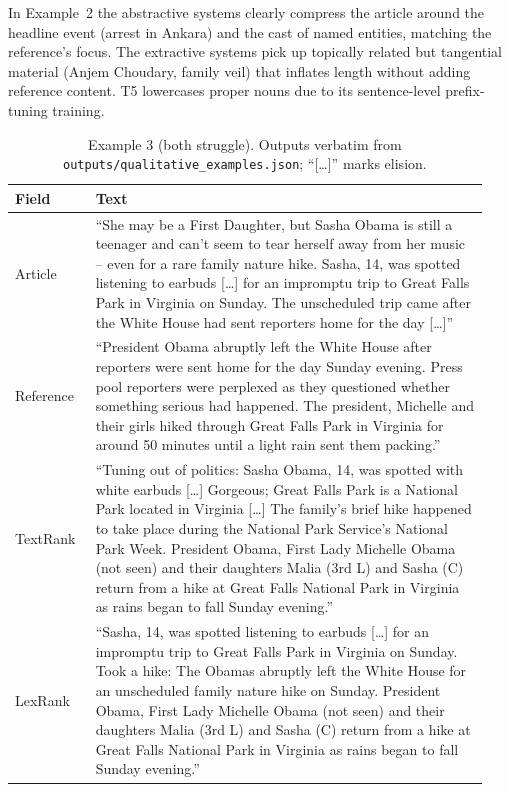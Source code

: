 In Example~2 the abstractive systems clearly compress the article around the headline event (arrest in Ankara) and the cast of named entities, matching the reference's focus. The extractive systems pick up topically related but tangential material (Anjem Choudary, family veil) that inflates length without adding reference content. T5 lowercases proper nouns due to its sentence-level prefix-tuning training.

\begin{table}[H]
\centering
\caption{Example 3 (both struggle). Outputs verbatim from \texttt{outputs/qualitative\_examples.json}; ``[\dots]'' marks elision.}
\small
\begin{tabular}{p{0.16\linewidth} p{0.78\linewidth}}
\toprule
\textbf{Field} & \textbf{Text} \\
\midrule
Article & ``She may be a First Daughter, but Sasha Obama is still a teenager and can't seem to tear herself away from her music -- even for a rare family nature hike. Sasha, 14, was spotted listening to earbuds [\dots] for an impromptu trip to Great Falls Park in Virginia on Sunday. The unscheduled trip came after the White House had sent reporters home for the day [\dots]'' \\
Reference & ``President Obama abruptly left the White House after reporters were sent home for the day Sunday evening. Press pool reporters were perplexed as they questioned whether something serious had happened. The president, Michelle and their girls hiked through Great Falls Park in Virginia for around 50 minutes until a light rain sent them packing.'' \\
TextRank & ``Tuning out of politics: Sasha Obama, 14, was spotted with white earbuds [\dots] Gorgeous; Great Falls Park is a National Park located in Virginia [\dots] The family's brief hike happened to take place during the National Park Service's National Park Week. President Obama, First Lady Michelle Obama (not seen) and their daughters Malia (3rd L) and Sasha (C) return from a hike at Great Falls National Park in Virginia as rains began to fall Sunday evening.'' \\
LexRank & ``Sasha, 14, was spotted listening to earbuds [\dots] for an impromptu trip to Great Falls Park in Virginia on Sunday. Took a hike: The Obamas abruptly left the White House for an unscheduled family nature hike on Sunday. President Obama, First Lady Michelle Obama (not seen) and their daughters Malia (3rd L) and Sasha (C) return from a hike at Great Falls National Park in Virginia as rains began to fall Sunday evening.'' \\

\end{tabular}
\end{table}
